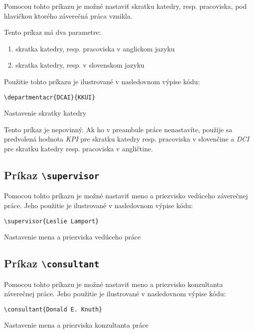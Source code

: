 Pomocou tohto príkazu je možné nastaviť skratku katedry, resp. pracoviska, pod hlavičkou ktorého záverečná práca vznikla.

Tento príkaz má dva parametre:
\begin{enumerate}
    \item skratka katedry, resp. pracoviska v anglickom jazyku
    \item skratka katedry, resp. v slovenskom jazyku
\end{enumerate}

Použitie tohto príkazu je ilustrované v nasledovnom výpise kódu:

\begin{listing}[ht]
\begin{verbatim}
\departmentacr{DCAI}{KKUI}
\end{verbatim}
\caption{Nastavenie skratky katedry}
\end{listing}

Tento príkaz je nepovinný. Ak ho v preambule práce nenastavíte, použije sa predvolená hodnota {\it KPI} pre skratku katedry resp. pracoviska v slovenčine a {\it DCI} pre skratku katedry resp. pracoviska v angličtine.

\subsection{Príkaz {\tt \textbackslash{}supervisor}}

Pomocou tohto príkazu je možné nastaviť meno a priezvisko vedúceho záverečnej práce. Jeho použitie je ilustrované v nasledovnom výpise kódu:

\begin{listing}[ht]
\begin{verbatim}
\supervisor{Leslie Lamport}
\end{verbatim}
\caption{Nastavenie mena a priezviska vedúceho práce}
\end{listing}


\subsection{Príkaz {\tt \textbackslash{}consultant}}

Pomocou tohto príkazu je možné nastaviť meno a priezvisko konzultanta záverečnej práce. Jeho použitie je ilustrované v nasledovnom výpise kódu:

\begin{listing}[ht!]
\begin{verbatim}
\consultant{Donald E. Knuth}
\end{verbatim}
\caption{Nastavenie mena a priezviska konzultanta práce}
\end{listing}



